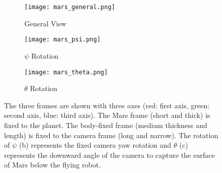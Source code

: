 
\begin{figure}[!t]
	\centering
	\begin{subfigure}[t]{0.3\columnwidth}
           	\centering
          	\texttt{[image: mars\_general.png]}
        		\caption{General View}
    	\end{subfigure}
    	\begin{subfigure}[t]{0.3\columnwidth}
           	\centering
          	\texttt{[image: mars\_psi.png]}
        		\caption{$\psi$ Rotation}
    	\end{subfigure}
	\begin{subfigure}[t]{0.3\columnwidth}
           	\centering
          	\texttt{[image: mars\_theta.png]}
        		\caption{$\theta$ Rotation}
    	\end{subfigure}
\caption{The three frames are shown with three axes (red: first axis, green: second axis, blue: third axis). The Mars frame (short and thick) is fixed to the planet. The body-fixed frame (medium thickness and length) is fixed to the camera frame (long and narrow). The rotation of $\psi$ (b) represents the fixed camera yaw rotation and $\theta$ (c) represents the downward angle of the camera to capture the surface of Mars below the flying robot.}
\label{fig:transforms}
\end{figure}


